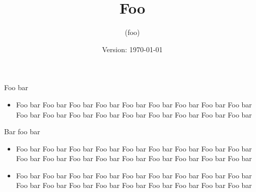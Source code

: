 \documentclass[a4,article]{seminar}
\begin{document}
\begin{slide}
\centerslidestrue
\begin{center}
\title{\LARGE Foo}
\author{(foo)}
\date{Version: \rm\today}
\maketitle

\vspace{2ex}
Foo bar\\

\end{center}
\end{slide}

\begin{itemize}
\item Foo bar Foo bar Foo bar Foo bar Foo bar Foo bar Foo bar Foo bar Foo bar
Foo bar Foo bar Foo bar Foo bar Foo bar Foo bar Foo bar Foo bar Foo bar
\end{itemize}

\pagebreak

\begin{slide}
Bar
foo bar
\end{slide}

\begin{itemize}
\item Foo bar Foo bar Foo bar Foo bar Foo bar Foo bar Foo bar Foo bar Foo bar
Foo bar Foo bar Foo bar Foo bar Foo bar Foo bar Foo bar Foo bar Foo bar
\item Foo bar Foo bar Foo bar Foo bar Foo bar Foo bar Foo bar Foo bar Foo bar
Foo bar Foo bar Foo bar Foo bar Foo bar Foo bar Foo bar Foo bar Foo bar
\end{itemize}

\begin{slide}
\centerslidestrue
{}
\end{slide}
\end{document}
